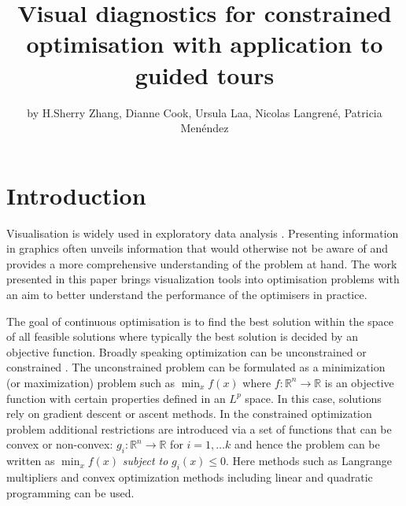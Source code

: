 \title{Visual diagnostics for constrained optimisation with application to
guided tours}
\author{by H.Sherry Zhang, Dianne Cook, Ursula Laa, Nicolas Langrené, Patricia Menéndez}

\maketitle


\hypertarget{introduction}{%
\section{Introduction}\label{introduction}}

Visualisation is widely used in exploratory data analysis
\citep{tukey1977exploratory, unwin2015graphical, healy2018data, wilke2019fundamentals}.
Presenting information in graphics often unveils information that would
otherwise not be aware of and provides a more comprehensive
understanding of the problem at hand. The work presented in this paper
brings visualization tools into optimisation problems with an aim to
better understand the performance of the optimisers in practice.

The goal of continuous optimisation is to find the best solution within
the space of all feasible solutions where typically the best solution is
decided by an objective function. Broadly speaking optimization can be
unconstrained or constrained \citep{kelley1999iterative}. The
unconstrained problem can be formulated as a minimization (or
maximization) problem such as \(\min_{x} f(x)\) where
\(f:\mathbb{R}^n \rightarrow \mathbb{R}\) is an objective function with
certain properties defined in an \(L^p\) space. In this case, solutions
rely on gradient descent or ascent methods. In the constrained
optimization problem additional restrictions are introduced via a set of
functions that can be convex or non-convex:
\(g_i:\mathbb{R}^n \rightarrow \mathbb{R}\) for \(i = 1, \ldots k\) and
hence the problem can be written as \(\min_{x} f(x)\) \emph{subject to}
\(g_i(x) \leq 0\). Here methods such as Langrange multipliers and convex
optimization methods including linear and quadratic programming can be
used.

